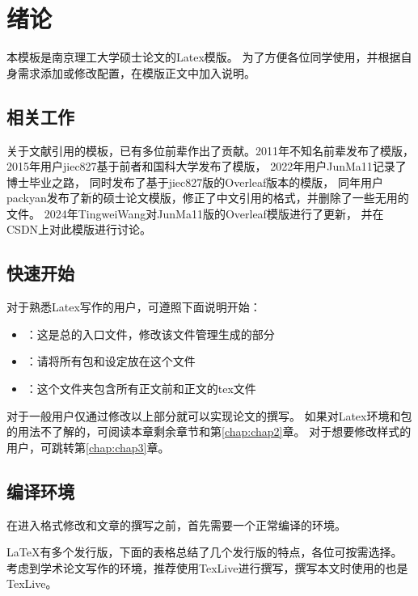 \chapter{绪论}
\label{chap:introduction}

本模板是南京理工大学硕士论文的Latex模版。
为了方便各位同学使用，并根据自身需求添加或修改配置，在模版正文中加入说明。

\section{相关工作}

关于文献引用的模板，已有多位前辈作出了贡献。2011年不知名前辈\cite{2011njust_thesis}发布了模版，
2015年用户jiec827\cite{jiec827}基于前者和国科大学发布了模版，
2022年用户JunMa11\cite{2020njust_thesis_PhD}记录了博士毕业之路，
同时发布了基于jiec827版的Overleaf版本的模版\cite{2020njust_thesis_PhD_overleaf}，
同年用户packyan\cite{2020njust_thesis_master}发布了新的硕士论文模版，修正了中文引用的格式，并删除了一些无用的文件。
2024年TingweiWang\cite{2024njust_thesis_overleaf}对JunMa11版的Overleaf模版进行了更新，
并在CSDN上对此模版进行讨论\cite{2024njust_thesis_csdn}。

\section{快速开始}

对于熟悉Latex写作的用户，可遵照下面说明开始：
\begin{itemize}
    \item {}：这是总的入口文件，修改该文件管理生成的部分
    \item {}：请将所有包和设定放在这个文件
    \item {}：这个文件夹包含所有正文前和正文的tex文件
\end{itemize}

对于一般用户仅通过修改以上部分就可以实现论文的撰写。
如果对Latex环境和包的用法不了解的，可阅读本章剩余章节和第\ref{chap:chap2}章。
对于想要修改样式的用户，可跳转第\ref{chap:chap3}章。

\section{编译环境}
\label{sec:compliment_evn}

在进入格式修改和文章的撰写之前，首先需要一个正常编译的环境。

\LaTeX 有多个发行版，下面的表格总结了几个发行版的特点，各位可按需选择。
考虑到学术论文写作的环境，推荐使用TexLive进行撰写，撰写本文时使用的也是TexLive。


